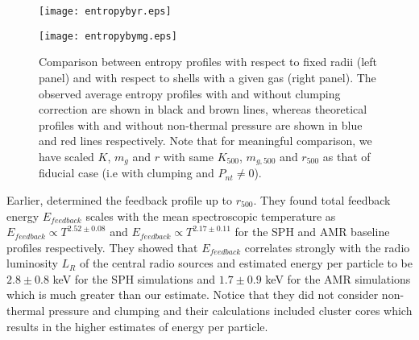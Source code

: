 \documentclass[a4paper,fleqn,usenatbib]{mnras}
\begin{document}
\begin{figure*}
\begin{minipage}{8.5cm}
\texttt{[image: entropybyr.eps]}
\end{minipage}
\begin{minipage}{8.5cm}
\texttt{[image: entropybymg.eps]}
\end{minipage}
\caption{
Comparison between entropy profiles with respect to fixed radii (left panel) and with respect to shells with a given gas (right panel). The observed average entropy profiles with and without clumping correction are  shown in black and brown lines, whereas theoretical profiles with and without non-thermal pressure are shown in  blue and  red lines respectively. Note that for meaningful comparison, we have scaled $K$, $m_g$ and $r$ with same $K_{500}$, $m_{g,500}$ and $r_{500}$ as that of fiducial case (i.e with clumping  and $P_{nt}\neq0$).}
\label{fig:comp}
\end{figure*}

Earlier, \cite{Chaudhuri2013} determined the feedback profile up to $r_{500}$.  They found total feedback energy $E_{feedback}$
scales with the mean spectroscopic temperature as $E_{feedback} \propto T^{2.52\pm0.08}$ and $E_{feedback} \propto T^{2.17\pm0.11}$ for the
SPH and AMR baseline profiles respectively. They showed that $E_{feedback}$ correlates strongly with the  radio luminosity $L_R$ of the central radio sources and estimated energy per particle to be $2.8 \pm 0.8$ keV for the SPH simulations and $1.7 \pm 0.9$ keV for the AMR simulations which is much greater than our estimate. 
Notice that they did not consider non-thermal pressure and clumping and their calculations included cluster cores which results in the higher estimates of energy per particle. 
\end{document}
